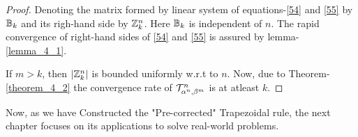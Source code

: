 \documentclass[../document.tex]{subfiles}
\begin{document}
\begin{theorem}
\begin{proof}
			Denoting the matrix formed by linear system of equations-\ref{54}
			and \ref{55} by $\mathbb{B}_k$ and its righ-hand side by $\mathbb{Z}_k^n$. Here  $\mathbb{B}_k$ is independent of $n$. The rapid convergence of right-hand sides of \ref{54} and \ref{55} is assured by lemma-\ref{lemma_4_1}.
			
			If $m>k$, then $|\mathbb{Z}_k^n|$ is bounded uniformly w.r.t to $n$.
			Now, due to Theorem-\ref{theorem_4_2} the convergence rate of 
			$\mathcal{T}_{\alpha^n,\beta^m}^{n}$ is at atleast $k$.
			
		\end{proof}
	\end{theorem}
	
	
	Now, as we have Constructed the "Pre-corrected" Trapezoidal rule, the next chapter focuses on its applications to solve real-world problems.
	
	
	
	
\end{document}
